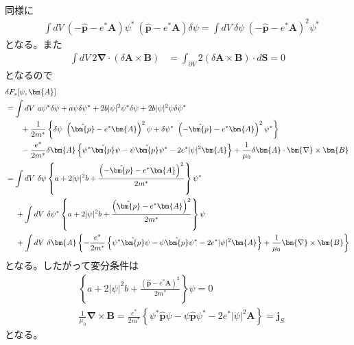 \documentclass[dvipdfmx, 11pt, a4paper]{jsarticle}
\numberwithin{equation}{section}
\theoremstyle{definition}
\begin{document}
\begin{derivationBox}
\begin{align}
        \end{align}
        同様に
        \begin{align}
            &\int dV\ \left( -\hat{\bm{p}} -e^*\bm{A} \right) \psi^*\ \left( \hat{\bm{p}} -e^*\bm{A}  \right)  \delta \psi = \int dV\ \delta \psi\ \left( -\hat{\bm{p}} -e^*\bm{A} \right)^2 \psi^*
        \end{align}
        となる。また
        \begin{align}
            \int dV\ 2\bm{\nabla} \cdot (\delta \bm{A} \times \bm{B}) &= \int_{\partial V} 2(\delta \bm{A} \times \bm{B}) \cdot d\bm{S} = 0
        \end{align}
        となるので
        \begin{align}
            &\delta F_s[\psi,\bm{A}] \notag \\
            &= \int dV\ a\psi^*\delta \psi  +  a\psi \delta \psi^* + 2b|\psi|^2 \psi^* \delta\psi + 2b|\psi|^2\psi \delta \psi^* \notag \\
            &\ \ \ \ \ \ + \frac{1}{2m^*} \left\{ \delta \psi\ \left( \hat{\bm{p}} -e^*\bm{A} \right)^2 \psi + \delta \psi^*\ \left( -\hat{\bm{p}} -e^*\bm{A} \right)^2 \psi^*  \right\}\notag \\
            &\ \ \ \ \ \ -\frac{e^*}{2m^*} \delta \bm{A} \left\{ \psi^*  \hat{\bm{p}}  \psi - \psi \hat{\bm{p}} \psi^* -2e^*|\psi|^2\bm{A} \right\} + \frac{1}{\mu_0}  \delta \bm{A} \cdot \bm{\nabla} \times \bm{B} \notag \\
            &= \int dV\ \delta \psi \left\{ a + 2|\psi|^2 b +\frac{\left( -\hat{\bm{p}} -e^*\bm{A} \right)^2}{2m^*} \right\} \psi^* \notag \\
            &\ \ \ \ +\int dV\ \delta \psi^* \left\{ a + 2|\psi|^2 b +\frac{\left( \hat{\bm{p}} -e^*\bm{A} \right)^2}{2m^*} \right\} \psi \notag \\
            &\ \ \ \ + \int dV\ \delta\bm{A} \left\{ -\frac{e^*}{2m^*}  \left\{ \psi^*  \hat{\bm{p}}  \psi - \psi \hat{\bm{p}} \psi^* -2e^*|\psi|^2\bm{A} \right\} + \frac{1}{\mu_0} \bm{\nabla} \times \bm{B} \right\}
        \end{align}
        となる。したがって変分条件は
        \begin{align}
            &\left\{ a + 2|\psi|^2 b +\frac{\left( \hat{\bm{p}} -e^*\bm{A} \right)^2}{2m^*} \right\} \psi = 0 \\
            &\frac{1}{\mu_0}\bm{\nabla} \times \bm{B} = \frac{e^*}{2m^*}  \left\{ \psi^*  \hat{\bm{p}}  \psi - \psi \hat{\bm{p}} \psi^* -2e^*|\psi|^2\bm{A} \right\} = \bm{j}_S
        \end{align}
        となる。
    \end{derivationBox}
\end{document}
